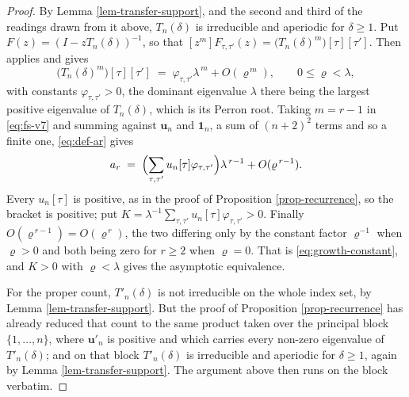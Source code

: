 \documentclass[11pt, a4paper, abstract=yes]{scrartcl}
\theoremstyle{definition}
\theoremstyle{remark}
\theoremstyle{plain}
\newcommand{\vek}[1]{\boldsymbol{#1}}
\let\autocite\cite
\begin{document}
\begin{proof}
By Lemma \ref{lem-transfer-support}, and the second and third of the readings drawn from it above,
\(T_n(\delta)\) is irreducible and aperiodic for \(\delta\ge1\). Put \(F(z)=(I-zT_n(\delta))^{-1}\), so that
\([z^m]F_{\tau,\tau'}(z)=\bigl(T_n(\delta)^m\bigr)[\tau][\tau']\). Then
\autocite[Theorem V.7]{FlajoletSedgewick2009} applies and gives
\begin{equation}\label{eq:fs-v7}
  \bigl(T_n(\delta)^m\bigr)[\tau][\tau']\;=\;\varphi_{\tau,\tau'}\lambda^{\,m}+O(\varrho^{\,m}),
  \qquad 0\le\varrho<\lambda ,
\end{equation}
with constants \(\varphi_{\tau,\tau'}>0\), the dominant eigenvalue \(\lambda\) there being the
largest positive eigenvalue of \(T_n(\delta)\), which is its Perron root. Taking \(m=r-1\) in
\eqref{eq:fs-v7} and summing against \(\vek u_n\) and \(\vek 1_n\), a sum of \((n+2)^2\) terms and
so a finite one, \eqref{eq:def-ar} gives
\[
  a_r\;=\;\Bigl(\sum_{\tau,\tau'}u_n[\tau]\varphi_{\tau,\tau'}\Bigr)\lambda^{\,r-1}+O(\varrho^{\,r-1}) .
\]
Every \(u_n[\tau]\) is positive, as in the proof of Proposition \ref{prop-recurrence}, so the bracket
is positive; put \(K=\lambda^{-1}\sum_{\tau,\tau'}u_n[\tau]\varphi_{\tau,\tau'}>0\). Finally
\(O(\varrho^{\,r-1})=O(\varrho^{\,r})\), the two differing only by the constant factor
\(\varrho^{-1}\) when \(\varrho>0\) and both being zero for \(r\ge2\) when \(\varrho=0\). That is
\eqref{eq:growth-constant}, and \(K>0\) with \(\varrho<\lambda\) gives the asymptotic equivalence.

For the proper count, \(T'_n(\delta)\) is not irreducible on the whole index set, by
Lemma \ref{lem-transfer-support}. But the proof of Proposition \ref{prop-recurrence} has already
reduced that count to the same product taken over the principal block \(\lbrace1,\dots,n\rbrace\),
where \(\vek u'_n\) is positive and which carries every non-zero eigenvalue of \(T'_n(\delta)\); and
on that block \(T'_n(\delta)\) is irreducible and aperiodic for \(\delta\ge1\), again by
Lemma \ref{lem-transfer-support}. The argument above then runs on the block verbatim.
\end{proof}
\end{document}
